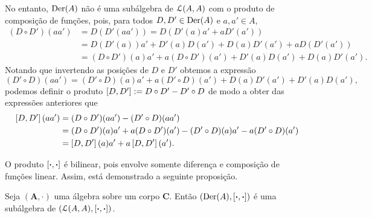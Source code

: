 No entanto, $\operatorname{Der}(A)$ não é uma subálgebra de $\mathcal{L}(A,A)$ com o produto de composição de funções, pois, para todos $D,D' \in \operatorname{Der}(A)$ e $a,a' \in A$,
	\begin{align*}
	(D \circ D')(aa') &= D(D'(aa')) = D(D'(a)a' + aD'(a')) \\
		&= D(D'(a))a' + D'(a)D(a') + D(a)D'(a') + a D(D'(a')) \\
		&= (D \circ D')(a)a' + a (D \circ D')(a') + D'(a)D(a') + D(a)D'(a').
	\end{align*}
Notando que invertendo as posições de $D$ e $D'$ obtemos a expressão
	\begin{equation*}
	(D' \circ D)(aa') = (D' \circ D)(a)a' + a (D' \circ D)(a') + D(a)D'(a') + D'(a)D(a'),
	\end{equation*}
podemos definir o produto $\left[{D},{D'}\right] := D \circ D' - D' \circ D$ de modo a obter das expressões anteriores que
	\begin{align*}
	\left[{D},{D'}\right](aa') &= (D \circ D')(aa') - (D' \circ D)(aa') \\
		&= (D \circ D')(a)a' + a (D \circ D')(a') - (D' \circ D)(a)a' - a (D' \circ D)(a') \\
		&= \left[{D},{D'}\right](a)a' + a\left[{D},{D'}\right](a').
	\end{align*}

O produto $\left[{\bm{\cdot}},{\bm{\cdot}}\right]$ é bilinear, pois envolve somente diferença e composição de funções linear. Assim, está demonstrado a seguinte proposição.

\begin{proposition}
\label{alge:prop.algebra.colchete.deriv}
Seja $(\bm A,\cdot)$ uma álgebra sobre um corpo $\bm C$. Então $(\operatorname{Der}(A),\left[{\bm{\cdot}},{\bm{\cdot}}\right])$ é uma subálgebra de $(\mathcal{L}(A,A),\left[{\bm{\cdot}},{\bm{\cdot}}\right])$.
\end{proposition}








